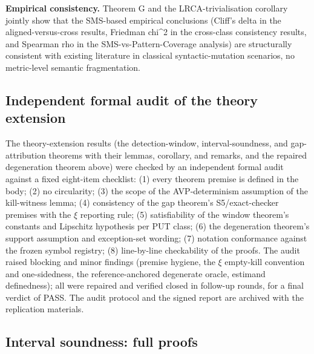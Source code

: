 \documentclass[manuscript,screen,review]{acmart}
\begin{document}
\textbf{Empirical consistency.} Theorem G and the LRCA-trivialisation
corollary jointly
show that the SMS-based empirical conclusions (Cliff's delta in the aligned-versus-cross results,
Friedman chi\^{}2 in the cross-class consistency results, and Spearman rho in the SMS-vs-Pattern-Coverage analysis) are structurally consistent
with existing \citet{d7c38286734419b52de4262c9802ebdfcf4b9447} literature in classical
syntactic-mutation scenarios, no metric-level semantic fragmentation.

\subsection{Independent formal audit of the theory extension}\label{g.5-independent-formal-audit}

The theory-extension results (the detection-window, interval-soundness,
and gap-attribution theorems with their lemmas, corollary, and remarks,
and the repaired degeneration theorem above) were checked by an
independent formal audit against a fixed eight-item checklist: (1)
every theorem premise is defined in the body; (2) no circularity; (3)
the scope of the AVP-determinism assumption of the kill-witness lemma;
(4) consistency of the gap theorem's S5/exact-checker premises with the
$\xi$ reporting rule; (5) satisfiability of the window theorem's
constants and Lipschitz hypothesis per PUT class; (6) the degeneration
theorem's support assumption and exception-set wording; (7) notation
conformance against the frozen symbol registry; (8) line-by-line
checkability of the proofs. The audit raised blocking and minor
findings (premise hygiene, the $\xi$ empty-kill convention and
one-sidedness, the reference-anchored degenerate oracle, estimand
definedness); all were repaired and verified closed in follow-up
rounds, for a final verdict of PASS. The audit protocol and the signed
report are archived with the replication materials.

\subsection{Interval soundness: full proofs}\label{g.6-interval-proofs}
\end{document}

